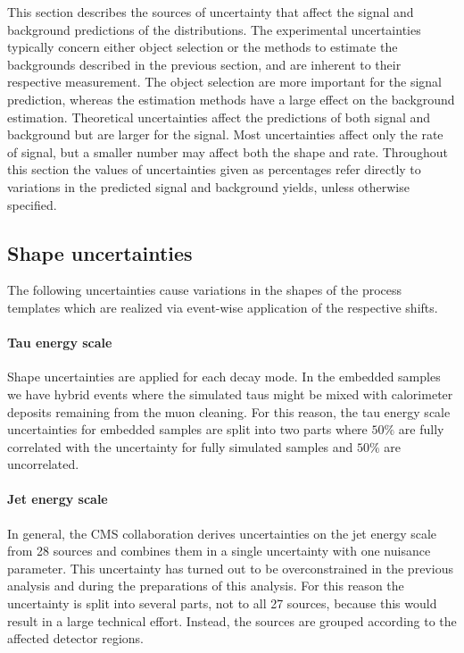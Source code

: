 This section describes the sources of uncertainty that affect the signal and background predictions of the \mttot distributions. The experimental uncertainties typically concern either object selection or the methods to estimate the backgrounds described in the previous section, and are inherent to their respective measurement. The object selection are more important for the signal prediction, whereas the estimation methods have a large effect on the background estimation. Theoretical uncertainties affect the predictions of both signal and background but are larger for the signal. Most uncertainties affect only the rate of signal, but a smaller number may affect both the shape and rate. Throughout this section the values of uncertainties given as percentages refer directly to variations in the predicted signal and background yields, unless otherwise specified.

\subsection{Shape uncertainties}
The following uncertainties cause variations in the shapes of the process templates which are realized via event-wise application of the respective shifts.

\paragraph{Tau energy scale} Shape uncertainties are applied for each decay mode. In the embedded samples we have hybrid events where the simulated taus might be mixed with calorimeter deposits remaining from the muon cleaning. For this reason, the tau energy scale uncertainties for embedded samples are split into two parts where $50\%$ are fully correlated with the uncertainty for fully simulated samples and $50\%$ are uncorrelated.

\paragraph{Jet energy scale} In general, the CMS collaboration derives uncertainties on the jet energy scale from 28 sources and combines them in a single uncertainty with one nuisance parameter. This uncertainty has turned out to be overconstrained in the previous analysis and during the preparations of this analysis. For this reason the uncertainty is split into several parts, not to all 27 sources, because this would result in a large technical effort. Instead, the sources are grouped according to the affected detector regions.

